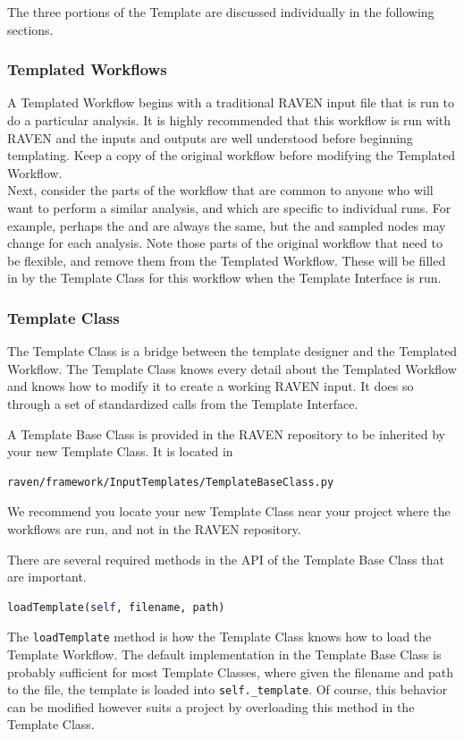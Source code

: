 The three portions of the Template are discussed individually in the following sections.

\subsubsection{Templated Workflows}
%
A Templated Workflow begins with a traditional RAVEN input file that is run to do a particular analysis. It is highly
%
recommended that this workflow is run with RAVEN and the inputs and outputs are well understood before beginning
%
templating. Keep a copy of the original workflow before modifying the Templated Workflow.
\\

Next, consider the parts of the workflow that are common to anyone who will want to perform a similar analysis, and
%
which are specific to individual runs. For example, perhaps the  and  are always the
%
same, but the  and sampled  nodes may change for each analysis. Note those parts of the
%
original workflow that need to be flexible, and remove them from the Templated Workflow. These will be filled in by the
%
Template Class for this workflow when the Template Interface is run.



\subsubsection{Template Class}
%
The Template Class is a bridge between the template designer and the Templated Workflow. The Template Class knows every
%
detail about the Templated Workflow and knows how to modify it to create a working RAVEN input.  It does so through a
%
set of standardized calls from the Template Interface.

A Template Base Class is provided in the RAVEN repository to be inherited by your new Template Class. It is located in
%
\begin{lstlisting}[language=bash]
 raven/framework/InputTemplates/TemplateBaseClass.py
\end{lstlisting}
%
We recommend you locate your new Template Class near your project where the workflows are run, and not in the RAVEN
%
repository.

There are several required methods in the API of the Template Base Class that are important.
%
\begin{lstlisting}[language=python]
 loadTemplate(self, filename, path)
\end{lstlisting}
%
The \texttt{loadTemplate} method is how the Template Class knows how to load the Template Workflow. The default
%
implementation in the Template Base Class is probably sufficient for most Template Classes, where given the filename and
%
path to the file, the template is loaded into \texttt{self.\_template}. Of course, this behavior can be modified however
%
suits a project by overloading this method in the Template Class.


